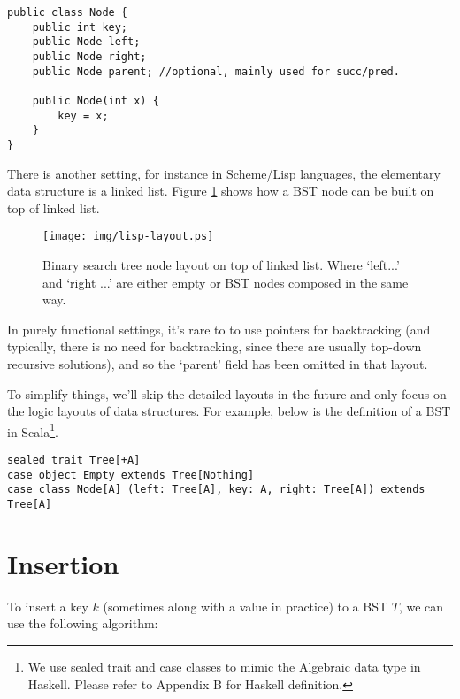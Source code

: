 \documentclass{article}
\begin{document}
\lstset{language=Java}
\begin{lstlisting}
public class Node {
    public int key;
    public Node left;
    public Node right;
    public Node parent; //optional, mainly used for succ/pred.

    public Node(int x) {
        key = x;
    }
}
\end{lstlisting}

There is another setting, for instance in Scheme/Lisp languages, the elementary
data structure is a linked list. Figure \ref{fig:lisp-layout} shows how a BST node can be built on top of linked list.

\begin{figure}[htbp]
       \begin{center}
        \texttt{[image: img/lisp-layout.ps]}
        \caption{Binary search tree node layout on top of linked list. Where `left...' and `right ...' are either empty or BST nodes composed in the same way.} \label{fig:lisp-layout}
       \end{center}
\end{figure}

In purely functional settings, it's rare to to use pointers for backtracking (and typically, there is no need for backtracking, since there are usually top-down recursive solutions), and so the `parent' field has been omitted in that layout.

To simplify things, we'll skip the detailed layouts in the future and only
focus on the logic layouts of data structures. For example, below is the definition
of a BST in Scala\footnote{We use sealed trait and case classes to mimic the Algebraic data type in Haskell. Please refer to Appendix B for Haskell definition.}.

\lstset{language=Scala}
\begin{lstlisting}
sealed trait Tree[+A]
case object Empty extends Tree[Nothing]
case class Node[A] (left: Tree[A], key: A, right: Tree[A]) extends Tree[A]
\end{lstlisting}

\section{Insertion}

To insert a key $k$ (sometimes along with a value in practice) to a BST $T$, we can use the following algorithm:
\end{document}
